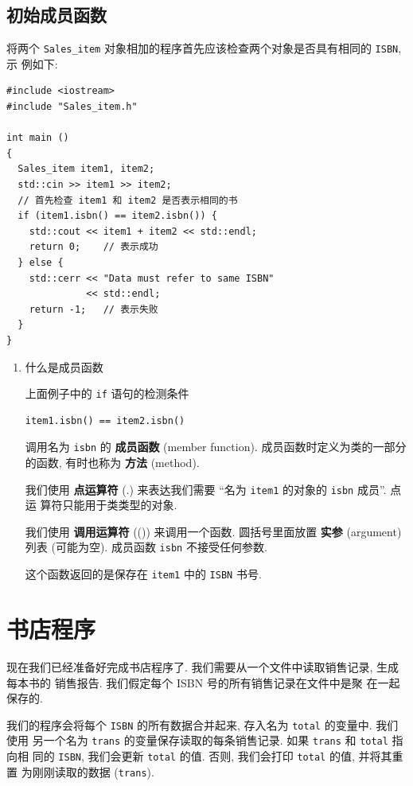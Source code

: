 \documentclass[lang=cn]{elegantbook}
\begin{document}
\subsection{初始成员函数}
\label{sec:org8ef0ceb}

将两个 \texttt{Sales\_item} 对象相加的程序首先应该检查两个对象是否具有相同的 \texttt{ISBN}, 示
例如下:

\begin{verbatim}
#include <iostream>
#include "Sales_item.h"

int main ()
{
  Sales_item item1, item2;
  std::cin >> item1 >> item2;
  // 首先检查 item1 和 item2 是否表示相同的书
  if (item1.isbn() == item2.isbn()) {
    std::cout << item1 + item2 << std::endl;
    return 0;    // 表示成功
  } else {
    std::cerr << "Data must refer to same ISBN"
              << std::endl;
    return -1;   // 表示失败
  }
}
\end{verbatim}

\begin{enumerate}
\item 什么是成员函数
\label{sec:org760df94}

上面例子中的 \texttt{if} 语句的检测条件

\begin{verbatim}
item1.isbn() == item2.isbn()
\end{verbatim}

调用名为 \texttt{isbn} 的 \textbf{成员函数} (member function). 成员函数时定义为类的一部分的函数,
有时也称为 \textbf{方法} (method).

我们使用 \textbf{点运算符} (.) 来表达我们需要 ``名为 \texttt{item1} 的对象的 \texttt{isbn} 成员''. 点运
算符只能用于类类型的对象.

我们使用 \textbf{调用运算符} (()) 来调用一个函数. 圆括号里面放置 \textbf{实参} (argument) 列表
(可能为空). 成员函数 \texttt{isbn} 不接受任何参数.

这个函数返回的是保存在 \texttt{item1} 中的 \texttt{ISBN} 书号.
\end{enumerate}

\section{书店程序}
\label{sec:org535d025}

现在我们已经准备好完成书店程序了. 我们需要从一个文件中读取销售记录, 生成每本书的
销售报告. 我们假定每个 ISBN 号的所有销售记录在文件中是聚
在一起保存的.

我们的程序会将每个 \texttt{ISBN} 的所有数据合并起来, 存入名为 \texttt{total} 的变量中. 我们使用
另一个名为 \texttt{trans} 的变量保存读取的每条销售记录. 如果 \texttt{trans} 和 \texttt{total} 指向相
同的 \texttt{ISBN}, 我们会更新 \texttt{total} 的值. 否则, 我们会打印 \texttt{total} 的值, 并将其重置
为刚刚读取的数据 (\texttt{trans}).
\end{document}
